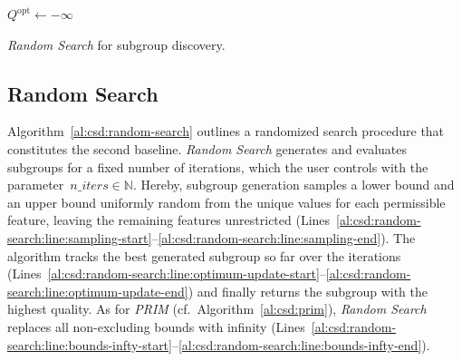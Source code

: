 \documentclass{article}
\theoremstyle{definition}
\begin{document}
\begin{algorithm}[t]
	\DontPrintSemicolon
	\BlankLine
	$Q^{\text{opt}} \leftarrow - \infty$\;
	\caption{\emph{Random Search} for subgroup discovery.}
	\label{al:csd:random-search}
\end{algorithm}

\subsection{Random Search}
\label{sec:csd:baselines:random-search}

Algorithm~\ref{al:csd:random-search} outlines a randomized search procedure that constitutes the second baseline.
\emph{Random Search} generates and evaluates subgroups for a fixed number of iterations, which the user controls with the parameter~$\mathit{n\_iters} \in \mathbb{N}$.
Hereby, subgroup generation samples a lower bound and an upper bound uniformly random from the unique values for each permissible feature, leaving the remaining features unrestricted (Lines~\ref{al:csd:random-search:line:sampling-start}--\ref{al:csd:random-search:line:sampling-end}).
The algorithm tracks the best generated subgroup so far over the iterations (Lines~\ref{al:csd:random-search:line:optimum-update-start}--\ref{al:csd:random-search:line:optimum-update-end}) and finally returns the subgroup with the highest quality.
As for \emph{PRIM} (cf.~Algorithm~\ref{al:csd:prim}), \emph{Random Search} replaces all non-excluding bounds with infinity (Lines~\ref{al:csd:random-search:line:bounds-infty-start}--\ref{al:csd:random-search:line:bounds-infty-end}).
\end{document}
